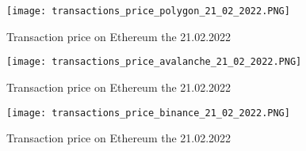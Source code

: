 \documentclass[a4paper,11pt,oneside]{report}
\begin{document}
\begin{center}
\begin{figure}[h!] 
  \texttt{[image: transactions\_price\_polygon\_21\_02\_2022.PNG]}
  \caption{Transaction price on Ethereum the 21.02.2022}
  \label{fig:transactions_price_polygon_21_02_2022}
\end{figure}
\end{center}

\begin{center}
\begin{figure}[h!] 
  \texttt{[image: transactions\_price\_avalanche\_21\_02\_2022.PNG]}
  \caption{Transaction price on Ethereum the 21.02.2022}
  \label{fig:transactions_price_avalanche_21_02_2022}
\end{figure}
\end{center}

\begin{center}
\begin{figure}[h!] 
  \texttt{[image: transactions\_price\_binance\_21\_02\_2022.PNG]}
  \caption{Transaction price on Ethereum the 21.02.2022}
  \label{fig:transactions_price_binance_21_02_2022}
\end{figure}
\end{center}
\end{document}
